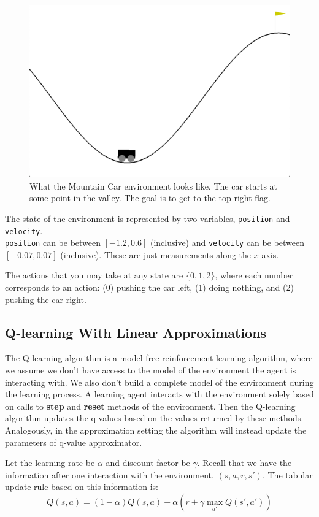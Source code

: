 \documentclass[11pt,addpoints,answers]{exam}
\begin{document}
\begin{figure}[H]
    \centering
    \includegraphics[width=0.5\linewidth]{figs/MountainCar.png}
    \caption{What the Mountain Car environment looks like. The car starts at some point in the valley. The goal is to get to the top right flag.}
    \label{fig:mountaincar}
\end{figure}

The state of the environment is represented by two variables, \texttt{position} and \texttt{velocity}.\\\texttt{position} can be between $[-1.2, 0.6]$ (inclusive) and \texttt{velocity} can be between $[-0.07, 0.07]$ (inclusive). These are just measurements along the $x$-axis.

The actions that you may take at any state are $\{0, 1, 2\}$, where each number corresponds to an action: (0) pushing the car left, (1) doing nothing, and (2) pushing the car right.

\subsection{Q-learning With Linear Approximations}
The Q-learning algorithm is a model-free reinforcement learning algorithm, where we assume we don't have access to the model of the environment the agent is interacting with. We also don't build a complete model of the environment during the learning process. A learning agent interacts with the environment solely based on calls to \textbf{step} and \textbf{reset} methods of the environment. Then the Q-learning algorithm updates the q-values based on the values returned by these methods. Analogously, in the approximation setting the algorithm will instead update the parameters of q-value approximator.


Let the learning rate be $\alpha$ and discount factor be $\gamma$. Recall that we have the information after one interaction with the environment, $(s, a, r, s')$. The tabular update rule based on this information is: 
\[
    Q(s,a) = (1 - \alpha) Q(s, a) + \alpha \left(r + \gamma \max_{a'} Q(s', a')\right)
\]
\end{document}
